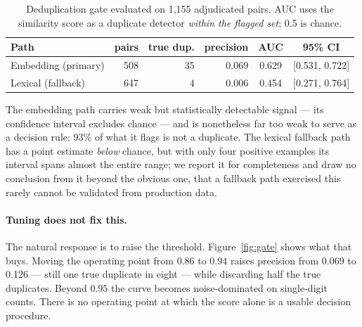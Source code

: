 \documentclass[10pt,a4paper]{article}
\begin{document}
\begin{table}[htbp]
\centering\small
\caption{Deduplication gate evaluated on 1{,}155 adjudicated pairs. AUC uses the
similarity score as a duplicate detector \emph{within the flagged set}; 0.5 is
chance.}
\label{tab:gate}
\begin{tabular}{@{}lrrrcc@{}}
\toprule
Path & pairs & true dup. & precision & AUC & 95\% CI \\
\midrule
Embedding (primary) & 508 & 35 & 0.069 & 0.629 & [0.531, 0.722] \\
Lexical (fallback)  & 647 &  4 & 0.006 & 0.454 & [0.271, 0.764] \\
\bottomrule
\end{tabular}
\end{table}

The embedding path carries weak but statistically detectable signal --- its
confidence interval excludes chance --- and is nonetheless far too weak to serve
as a decision rule: 93\% of what it flags is not a duplicate. The lexical
fallback path has a point estimate \emph{below} chance, but with only four
positive examples its interval spans almost the entire range; we report it for
completeness and draw no conclusion from it beyond the obvious one, that a
fallback path exercised this rarely cannot be validated from production data.

\paragraph{Tuning does not fix this.} The natural response is to raise the
threshold. Figure~\ref{fig:gate} shows what that buys. Moving the operating point
from $0.86$ to $0.94$ raises precision from 0.069 to 0.126 --- still one true
duplicate in eight --- while discarding half the true duplicates. Beyond $0.95$
the curve becomes noise-dominated on single-digit counts. There is no operating
point at which the score alone is a usable decision procedure.
\end{document}

